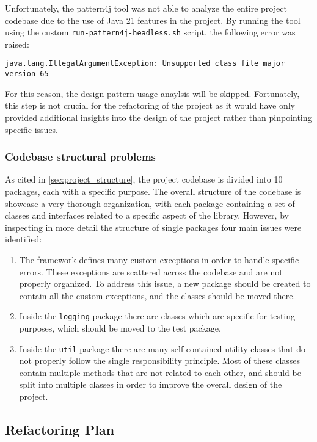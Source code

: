 Unfortunately, the pattern4j tool was not able to analyze the entire project codebase due to the use of Java 21 features in the project. By running the tool using the custom \texttt{run-pattern4j-headless.sh} script, the following error was raised:

\begin{verbatim}
java.lang.IllegalArgumentException: Unsupported class file major version 65
\end{verbatim}

\noindent For this reason, the design pattern usage anaylsis will be skipped. Fortunately, this step is not crucial for the refactoring of the project as it would have only provided additional insights into the design of the project rather than pinpointing specific issues.

\subsubsection{Codebase structural problems}

As cited in \autoref{sec:project_structure}, the project codebase is divided into 10 packages, each with a specific purpose. The overall structure of the codebase is showcase a very thorough organization, with each package containing a set of classes and interfaces related to a specific aspect of the library. However, by inspecting in more detail the structure of single packages four main issues were identified:

\begin{enumerate}
	\item The framework defines many custom exceptions in order to handle specific errors. These exceptions are scattered across the codebase and are not properly organized. To address this issue, a new package should be created to contain all the custom exceptions, and the classes should be moved there.
	\item Inside the \texttt{logging} package there are classes which are specific for testing purposes, which should be moved to the test package.
	\item Inside the \texttt{util} package there are many self-contained utility classes that do not properly follow the single responsibility principle. Most of these classes contain multiple methods that are not related to each other, and should be split into multiple classes in order to improve the overall design of the project.
\end{enumerate}

\subsection{Refactoring Plan}
\label{sec:refactoring_plan}

